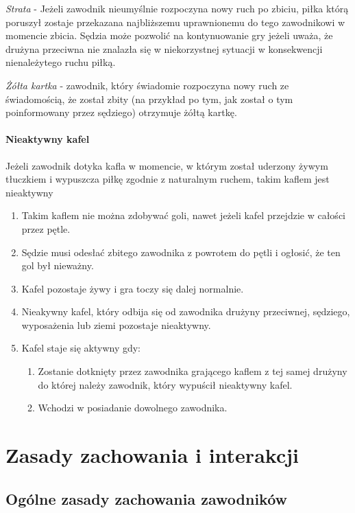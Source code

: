 \documentclass[12pt]{article}
\begin{document}
\emph{Strata} - Jeżeli zawodnik nieumyślnie rozpoczyna nowy ruch po
zbiciu, piłka którą poruszył zostaje przekazana najbliższemu
uprawnionemu do tego zawodnikowi w momencie zbicia. Sędzia może pozwolić
na kontynuowanie gry jeżeli uważa, że drużyna przeciwna nie znalazła się
w niekorzystnej sytuacji w konsekwencji nienależytego ruchu piłką.

\emph{Żółta kartka} - zawodnik, który świadomie rozpoczyna nowy ruch ze
świadomością, że został zbity (na przykład po tym, jak został o tym
poinformowany przez sędziego) otrzymuje żółtą kartkę.

\paragraph{Nieaktywny kafel}
Jeżeli zawodnik dotyka kafla w
momencie, w którym został uderzony żywym tłuczkiem i wypuszcza piłkę
zgodnie z naturalnym ruchem, takim kaflem jest nieaktywny

\begin{enumerate}
	\item
	      Takim kaflem nie można zdobywać goli, nawet jeżeli kafel przejdzie w
	      całości przez pętle.
	\item
	      Sędzie musi odesłać zbitego zawodnika z powrotem do pętli i ogłosić,
	      że ten gol był nieważny.
	\item
	      Kafel pozostaje żywy i gra toczy się dalej normalnie.
	\item
	      Nieakywny kafel, który odbija się od zawodnika drużyny przeciwnej,
	      sędziego, wyposażenia lub ziemi pozostaje nieaktywny.
	\item
	      Kafel staje się aktywny gdy:

	      \begin{enumerate}
		      \item
		            Zostanie dotknięty przez zawodnika grającego kaflem z tej samej
		            drużyny do której należy zawodnik, który wypuścił nieaktywny kafel.
		      \item
		            Wchodzi w posiadanie dowolnego zawodnika.
	      \end{enumerate}
\end{enumerate}

\pagebreak
\section{Zasady zachowania i interakcji}

\subsection{Ogólne zasady zachowania zawodników}
\end{document}
